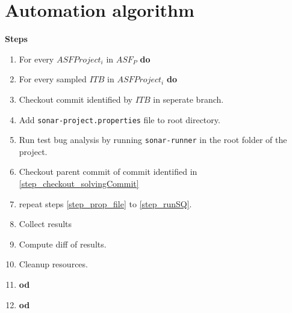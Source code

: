 \documentclass{uvamscse}
\begin{document}


{%


}

\appendix

\chapter{Automation algorithm}
\textbf{Steps}\\
\begin{enumerate}
	\item For every $ASFProject_i$ in $ASF_P$ \textbf{do}
	\item \hspace{1cm}For every sampled $ITB$ in $ASFProject_i$ \textbf{do}
	\item \hspace{2cm} \label{step_checkout_solvingCommit} Checkout commit identified by $ITB$ in seperate branch.
	\item \hspace{2cm} \label{step_prop_file} Add \texttt{sonar-project.properties} file to root directory.
	\item \hspace{2cm} \label{step_runSQ} Run test bug analysis by running \texttt{sonar-runner} in the root folder of the project.
	\item \hspace{2cm} \label{step_parent_commit} Checkout parent commit of commit identified in \ref{step_checkout_solvingCommit}
	\item \hspace{2cm} repeat steps \ref{step_prop_file} to  \ref{step_runSQ}.
	\item \hspace{2cm} \label{collectResults} Collect results
	\item \hspace{2cm} \label{step_comp_diff} Compute diff of results.
	\item \hspace{2cm} \label{step_cleanup} Cleanup resources.
	\item \hspace{1cm} \textbf{od}
	\item \textbf{od}

\end{enumerate}
\end{document}

